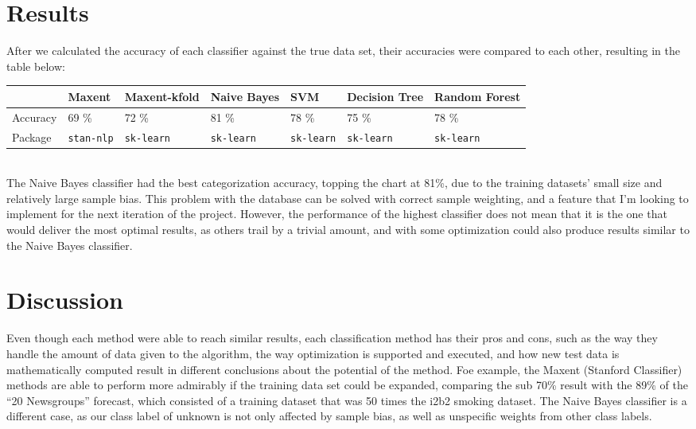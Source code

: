\documentclass[12pt]{article}
\begin{document}
\section{Results}
After we calculated the accuracy of each classifier against the true data set, their accuracies were compared to each other, resulting in the table below:
\begin{table}[h]
\centering

\label{my-label}
\begin{tabular}{|l|l|l|l|l|l|l|}
\hline
         & Maxent              & Maxent-kfold     & Naive Bayes        & SVM                & Decision Tree      & Random Forest      \\ \hline
Accuracy & 69 \%                  & 72 \%                 & 81 \%              & 78 \%              & 75  \%               & 78  \%      \\ \hline
Package  & \texttt{stan-nlp} & \texttt{sk-learn} & \texttt{sk-learn} & \texttt{sk-learn} & \texttt{sk-learn} & \texttt{sk-learn} \\
\hline
\end{tabular}
\end{table}
\\
The Naive Bayes classifier had the best categorization accuracy, topping the chart at 81\%, due to the training datasets' small size and relatively large sample bias. This problem with the database can be solved with correct sample weighting, and a feature that I'm looking to implement for the next iteration of the project. However, the performance of the highest classifier does not mean that it is the one that would deliver the most optimal results, as others trail by a trivial amount, and with some optimization could also produce results similar to the Naive Bayes classifier.

\section{Discussion}
Even though each method were able to reach similar results, each classification method has their pros and cons, such as the way they handle the amount of data given to the algorithm, the way optimization is supported and executed, and how new test data is mathematically computed result in different conclusions about the potential of the method. Foe example, the Maxent (Stanford Classifier) methods are able to perform more admirably if the training data set could be expanded, comparing the sub 70\% result with the 89\% of the ``20 Newsgroups'' forecast, which consisted of a training dataset that was 50 times the i2b2 smoking dataset. The Naive Bayes classifier is a different case, as our class label of unknown is not only affected by sample bias, as well as unspecific weights from other class labels.
\end{document}
